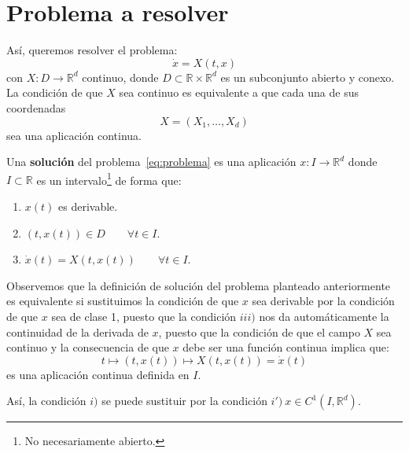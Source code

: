 \section{Problema a resolver}
\noindent
Así, queremos resolver el problema:
\begin{equation}\label{eq:problema}
    \dot{x} = X(t,x)
\end{equation}
con $X:D\to \mathbb{R}^d$ continuo, donde $D\subset \mathbb{R}\times\mathbb{R}^d$ es un subconjunto abierto y conexo. La condición de que $X$ sea continuo es equivalente a que cada una de sus coordenadas
\begin{equation*}
    X = (X_1,\ldots,X_d)
\end{equation*}
sea una aplicación continua.

\begin{definicion}
    Una \textbf{solución} del problema~\eqref{eq:problema} es una aplicación $x:I\to \mathbb{R}^d$ donde  $I\subset \mathbb{R}$ es un intervalo\footnote{No necesariamente abierto.} de forma que:
    \begin{enumerate}
        \item[$i)$] $x(t)$ es derivable.
        \item[$ii)$] $(t,x(t))\in D\qquad \forall t\in I$.
        \item[$iii)$] $\dot{x}(t) = X(t,x(t)) \qquad \forall t\in I$.
    \end{enumerate}
\end{definicion}

\begin{observacion}
    Observemos que la definición de solución del problema planteado anteriormente es equivalente si sustituimos la condición de que $x$ sea derivable por la condición de que $x$ sea de clase 1, puesto que la condición $iii)$ nos da automáticamente la continuidad de la derivada de $x$, puesto que la condición de que el campo $X$ sea continuo y la consecuencia de que $x$ debe ser una función continua implica que:
    \begin{equation*}
        t\longmapsto (t, x(t)) \longmapsto X(t,x(t)) = \dot{x}(t)
    \end{equation*}
    es una aplicación continua definida en $I$.

    \noindent
    Así, la condición $i)$ se puede sustituir por la condición $i')~x\in C^1(I,\mathbb{R}^d)$.
\end{observacion}

